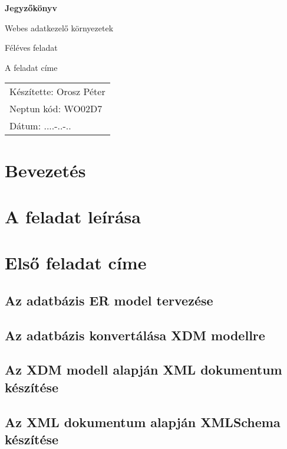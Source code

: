\documentclass{article}
\begin{document}
    \onehalfspacing %
    \justifying %

    \begin{titlepage}
        \centering
        \vspace*{0.25\textheight}
        {\fontsize{64}{32}\bfseries Jegyzőkönyv \par}
        \vspace{1.5em}
        {\fontsize{25}{64}\normalfont Webes adatkezelő környezetek \par}
        \vspace{1em}
        {\fontsize{25}{32}\normalfont Féléves feladat \par}
        \vspace{1em}
        {\fontsize{25}{32}\normalfont A feladat címe \par}
        \vspace*{0.20\textheight}

        \begin{flushright}
            \begin{tabular}{@{}l@{}}
                {\fontsize{14}{14}\normalfont Készítette: Orosz Péter} \\
                {\fontsize{14}{14}\normalfont Neptun kód: WO02D7} \\
                {\fontsize{14}{14}\normalfont Dátum: ....-..-..} \\
            \end{tabular}
        \end{flushright}
    \end{titlepage}

    \tableofcontents
    \newpage

    \section*{Bevezetés}

    \section*{A feladat leírása}

    \section{Első feladat címe}
        \subsection{Az adatbázis ER model tervezése}
        \subsection{Az adatbázis konvertálása XDM modellre}
        \subsection{Az XDM modell alapján XML dokumentum készítése}
        \subsection{Az XML dokumentum alapján XMLSchema készítése}
\end{document}
